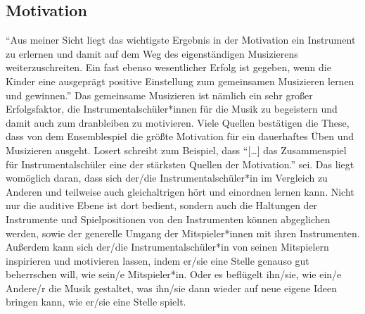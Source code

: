 \subsection{Motivation}

\enquote{Aus meiner Sicht liegt das wichtigste Ergebnis in der Motivation ein
Instrument zu erlernen und damit auf dem Weg des eigenständigen Musizierens
weiterzuschreiten. Ein fast ebenso wesentlicher Erfolg ist gegeben, wenn die
Kinder eine ausgeprägt positive Einstellung zum gemeinsamen Musizieren lernen
und gewinnen.}\autocite[40]{ernst:die_zukunftsfaehige_musikschule} Das
gemeinsame Musizieren ist nämlich ein sehr großer Erfolgsfaktor, die
Instrumentalschüler*innen für die Musik zu begeistern und damit auch zum
dranbleiben zu motivieren. Viele Quellen bestätigen die These, dass von dem
Ensemblespiel die größte Motivation für ein dauerhaftes Üben und Musizieren
ausgeht. Losert schreibt zum Beispiel, dass \enquote{[…] das Zusammenspiel für
Instrumentalschüler eine der stärksten Quellen der Motivation.} sei.
\autocite[92]{losert:die_kunst_zu_unterrichten} Das liegt womöglich daran, dass
sich der/die Instrumentalschüler*in im Vergleich zu Anderen und teilweise auch
gleichaltrigen hört und einordnen lernen kann. Nicht nur die auditive Ebene ist
dort bedient, sondern auch die Haltungen der Instrumente und Spielpositionen von
den Instrumenten können abgeglichen werden, sowie der generelle Umgang der
Mitspieler*innen mit ihren Instrumenten. Außerdem kann sich der/die
Instrumentalschüler*in von seinen Mitspielern inspirieren und motivieren lassen,
indem er/sie eine Stelle genauso gut beherrschen will, wie sein/e Mitspieler*in.
Oder es beflügelt ihn/sie, wie ein/e Andere/r die Musik gestaltet, was ihn/sie
dann wieder auf neue eigene Ideen bringen kann, wie er/sie eine Stelle spielt.

